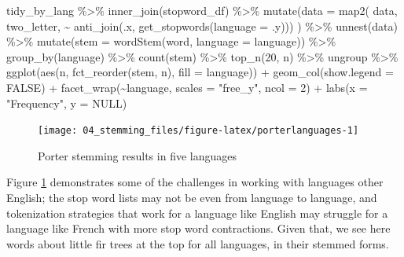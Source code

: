 \documentclass[
]{krantz}
\makeatletter
\newenvironment{Shaded}{\begin{snugshade}}{\end{snugshade}}
\newcommand{\AttributeTok}[1]{\textcolor[rgb]{0.77,0.63,0.00}{#1}}
\newcommand{\ConstantTok}[1]{\textcolor[rgb]{0.00,0.00,0.00}{#1}}
\newcommand{\DecValTok}[1]{\textcolor[rgb]{0.00,0.00,0.81}{#1}}
\newcommand{\FunctionTok}[1]{\textcolor[rgb]{0.00,0.00,0.00}{#1}}
\newcommand{\NormalTok}[1]{#1}
\newcommand{\SpecialCharTok}[1]{\textcolor[rgb]{0.00,0.00,0.00}{#1}}
\newcommand{\StringTok}[1]{\textcolor[rgb]{0.31,0.60,0.02}{#1}}
\newenvironment{kframe}{%
\medskip{}
\setlength{\fboxsep}{.8em}
 \def\at@end@of@kframe{}%
 \ifinner\ifhmode%
  \def\at@end@of@kframe{\end{minipage}}%
  \begin{minipage}{\columnwidth}%
 \fi\fi%
 \def\FrameCommand##1{\hskip\@totalleftmargin \hskip-\fboxsep
 \colorbox{shadecolor}{##1}\hskip-\fboxsep
     \hskip-\linewidth \hskip-\@totalleftmargin \hskip\columnwidth}%
 \MakeFramed {\advance\hsize-\width
   \@totalleftmargin\z@ \linewidth\hsize
   \@setminipage}}%
 {\par\unskip\endMakeFramed%
 \at@end@of@kframe}
\renewenvironment{Shaded}{\begin{kframe}}{\end{kframe}}
\makeatother
\begin{document}
\begin{Shaded}
\begin{Highlighting}[]
\NormalTok{tidy\_by\_lang }\SpecialCharTok{\%\textgreater{}\%}
  \FunctionTok{inner\_join}\NormalTok{(stopword\_df) }\SpecialCharTok{\%\textgreater{}\%}
  \FunctionTok{mutate}\NormalTok{(}\AttributeTok{data =} \FunctionTok{map2}\NormalTok{(}
\NormalTok{    data, two\_letter, }\SpecialCharTok{\textasciitilde{}} \FunctionTok{anti\_join}\NormalTok{(.x, }\FunctionTok{get\_stopwords}\NormalTok{(}\AttributeTok{language =}\NormalTok{ .y)))}
\NormalTok{  ) }\SpecialCharTok{\%\textgreater{}\%}
  \FunctionTok{unnest}\NormalTok{(data) }\SpecialCharTok{\%\textgreater{}\%}
  \FunctionTok{mutate}\NormalTok{(}\AttributeTok{stem =} \FunctionTok{wordStem}\NormalTok{(word, }\AttributeTok{language =}\NormalTok{ language)) }\SpecialCharTok{\%\textgreater{}\%}
  \FunctionTok{group\_by}\NormalTok{(language) }\SpecialCharTok{\%\textgreater{}\%}
  \FunctionTok{count}\NormalTok{(stem) }\SpecialCharTok{\%\textgreater{}\%}
  \FunctionTok{top\_n}\NormalTok{(}\DecValTok{20}\NormalTok{, n) }\SpecialCharTok{\%\textgreater{}\%}
\NormalTok{  ungroup }\SpecialCharTok{\%\textgreater{}\%}
  \FunctionTok{ggplot}\NormalTok{(}\FunctionTok{aes}\NormalTok{(n, }\FunctionTok{fct\_reorder}\NormalTok{(stem, n), }\AttributeTok{fill =}\NormalTok{ language)) }\SpecialCharTok{+}
  \FunctionTok{geom\_col}\NormalTok{(}\AttributeTok{show.legend =} \ConstantTok{FALSE}\NormalTok{) }\SpecialCharTok{+}
  \FunctionTok{facet\_wrap}\NormalTok{(}\SpecialCharTok{\textasciitilde{}}\NormalTok{language, }\AttributeTok{scales =} \StringTok{"free\_y"}\NormalTok{, }\AttributeTok{ncol =} \DecValTok{2}\NormalTok{) }\SpecialCharTok{+}
  \FunctionTok{labs}\NormalTok{(}\AttributeTok{x =} \StringTok{"Frequency"}\NormalTok{, }\AttributeTok{y =} \ConstantTok{NULL}\NormalTok{)}
\end{Highlighting}
\end{Shaded}

\begin{figure}

{\centering \texttt{[image: 04\_stemming\_files/figure-latex/porterlanguages-1]} 

}

\caption{Porter stemming results in five languages}\label{fig:porterlanguages}
\end{figure}

Figure \ref{fig:porterlanguages} demonstrates some of the challenges in working with languages other English; the stop word lists may not be even from language to language, and tokenization strategies that work for a language like English may struggle for a language like French with more stop word contractions. Given that, we see here words about little fir trees at the top for all languages, in their stemmed forms.
\end{document}
